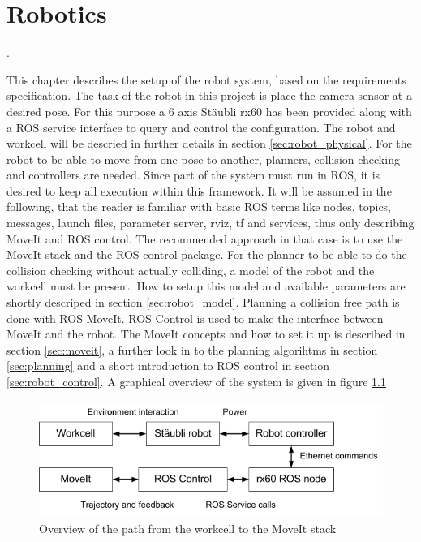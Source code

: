 \chapter{Robotics}
.

This chapter describes the setup of the robot system, based on the requirements specification. The task of the robot in this project is place the camera sensor at a desired pose. For this purpose a 6 axis Stäubli rx60 has been provided along with a ROS service interface to query and control the configuration. The robot and workcell will be descried in further details in section \ref{sec:robot_physical}. For the robot to be able to move from one pose to another, planners, collision checking and controllers are needed. Since part of the system must run in ROS, it is desired to keep all execution within this framework. It will be assumed in the following, that the reader is familiar with basic ROS terms like nodes, topics, messages, launch files, parameter server, rviz, tf and services, thus only describing MoveIt and ROS control. The recommended approach in that case is to use the MoveIt stack and the ROS control package.  For the planner to be able to do the collision checking without actually colliding, a model of the robot and the workcell must be present. How to setup this model and available parameters are shortly descriped in section \ref{sec:robot_model}. Planning a collision free path is done with ROS MoveIt. ROS Control is used to make the interface between MoveIt and the robot. The MoveIt concepts and how to set it up is described in section \ref{sec:moveit}, a further look in to the planning algorihtms in section \ref{sec:planning} and a short introduction to ROS control in section \ref{sec:robot_control}. A graphical overview of the system is given in figure \ref{fig:workcell_to_moveit_path}


\begin{figure}[htb]
	\begin{center}
		\includegraphics[scale=0.5,trim=0 0 0 0]{graphics/05_robotics/workcell_to_moveIt_path.png}%
		\caption{Overview of the path from the workcell to the MoveIt stack}
		\label{fig:workcell_to_moveit_path}
	\end{center}
\end{figure}

